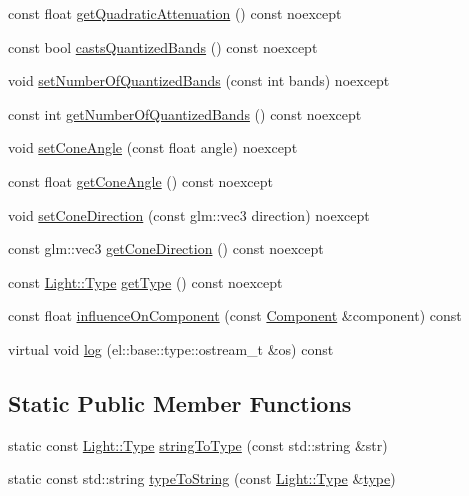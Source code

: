 \begin{DoxyCompactItemize}
\item 
const float \hyperlink{class_graphics_1_1_light_aa3e34ad4fb661f2aa02c588d84c77173}{get\+Quadratic\+Attenuation} () const noexcept
\item 
const bool \hyperlink{class_graphics_1_1_light_a428cc9c8dbc7af11719417c5cad116ec}{casts\+Quantized\+Bands} () const noexcept
\item 
void \hyperlink{class_graphics_1_1_light_a65b266f9d2d3947ad0c57453e7df68bf}{set\+Number\+Of\+Quantized\+Bands} (const int bands) noexcept
\item 
const int \hyperlink{class_graphics_1_1_light_a008fca2c68899c80596f3fdcd61b5bfa}{get\+Number\+Of\+Quantized\+Bands} () const noexcept
\item 
void \hyperlink{class_graphics_1_1_light_a668d13ecfa976aea06da37ef74cc364b}{set\+Cone\+Angle} (const float angle) noexcept
\item 
const float \hyperlink{class_graphics_1_1_light_ac319eca9a1a6e9fe266f49d8b7424aa8}{get\+Cone\+Angle} () const noexcept
\item 
void \hyperlink{class_graphics_1_1_light_a1d4588fb18c81ef255ade5456b6a32f1}{set\+Cone\+Direction} (const glm\+::vec3 direction) noexcept
\item 
const glm\+::vec3 \hyperlink{class_graphics_1_1_light_aaf7c72aaa31711c07d44c530f89e29f6}{get\+Cone\+Direction} () const noexcept
\item 
const \hyperlink{class_graphics_1_1_light_a6c3bc4c73b1bc4a96e0376be4ce0c007}{Light\+::\+Type} \hyperlink{class_graphics_1_1_light_ad0ad78754ea7c205fa2dae8ad6c1d7b9}{get\+Type} () const noexcept
\item 
const float \hyperlink{class_graphics_1_1_light_a346c0e548fbec8de944642f638418a78}{influence\+On\+Component} (const \hyperlink{class_component}{Component} \&component) const 
\item 
virtual void \hyperlink{class_graphics_1_1_light_a2f6b15e75d42564f0db9dea75847a3e6}{log} (el\+::base\+::type\+::ostream\+\_\+t \&os) const 
\end{DoxyCompactItemize}
\subsection*{Static Public Member Functions}
\begin{DoxyCompactItemize}
\item 
static const \hyperlink{class_graphics_1_1_light_a6c3bc4c73b1bc4a96e0376be4ce0c007}{Light\+::\+Type} \hyperlink{class_graphics_1_1_light_a198ad8d3b143ca175cb201f79273bf24}{string\+To\+Type} (const std\+::string \&str)
\item 
static const std\+::string \hyperlink{class_graphics_1_1_light_a4dc16da5f94db88e73689064623b0bd7}{type\+To\+String} (const \hyperlink{class_graphics_1_1_light_a6c3bc4c73b1bc4a96e0376be4ce0c007}{Light\+::\+Type} \&\hyperlink{class_graphics_1_1_light_a91b3331f89b6e025dfecfdc441a7080f}{type})
\end{DoxyCompactItemize}
